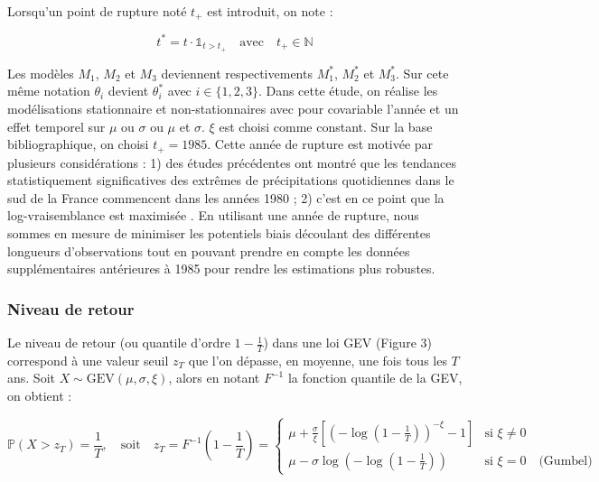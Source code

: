 \documentclass[
  article,
  nofooter,
  noheadings]{jss}
\begin{document}
Lorsqu'un point de rupture noté \(t_+\) est introduit, on note :

\[
t^\ast = t \cdot \mathbb{1}_{t > t_+} \quad \text{avec} \quad t_+ \in \mathbb{N}
\]

Les modèles \(M_1\), \(M_2\) et \(M_3\) deviennent respectivements
\(M_1^\ast\), \(M_2^\ast\) et \(M_3^\ast\). Sur cete même notation
\(\theta_i\) devient \(\theta^\ast_i\) avec \(i \in \{1, 2, 3\}\). Dans
cette étude, on réalise les modélisations stationnaire et
non-stationnaires avec pour covariable l'année et un effet temporel sur
\(\mu\) ou \(\sigma\) ou \(\mu\) et \(\sigma\). \(\xi\) est choisi comme
constant. Sur la base bibliographique, on choisi \(t_+ = 1985\). Cette
année de rupture est motivée par plusieurs considérations : 1) des
études précédentes ont montré que les tendances statistiquement
significatives des extrêmes de précipitations quotidiennes dans le sud
de la France commencent dans les années 1980 \citep{Blanchet2018} ; 2)
c'est en ce point que la log-vraisemblance est maximisée
\citep{blanchet2022instrumental}. En utilisant une année de rupture,
nous sommes en mesure de minimiser les potentiels biais découlant des
différentes longueurs d'observations tout en pouvant prendre en compte
les données supplémentaires antérieures à 1985 pour rendre les
estimations plus robustes.

\subsubsection{Niveau de retour}\label{niveau-de-retour}

Le niveau de retour (ou quantile d'ordre \(1 - \tfrac{1}{T}\)) dans une
loi GEV (Figure 3) correspond à une valeur seuil \(z_T\) que l'on
dépasse, en moyenne, une fois tous les \(T\) ans. Soit
\(X \sim \mathrm{GEV}(\mu, \sigma, \xi)\), alors en notant \(F^{-1}\) la
fonction quantile de la GEV, on obtient :

\begin{tcolorbox}[enhanced jigsaw, toprule=.15mm, bottomrule=.15mm, colback=white, breakable, left=2mm, leftrule=.75mm, colframe=quarto-callout-color-frame, arc=.35mm, rightrule=.15mm, opacityback=0]

\[
\mathbb{P}(X > z_T) = \frac{1}{T}, \quad \text{soit} \quad z_T = F^{-1}\left(1 - \frac{1}{T} \right) = 
\begin{cases}
\mu + \frac{\sigma}{\xi} \left[ \left( -\log\left(1 - \frac{1}{T}\right) \right)^{-\xi} - 1 \right] & \text{si } \xi \ne 0 \\
\mu - \sigma \log \left( -\log\left(1 - \frac{1}{T} \right) \right) & \text{si } \xi = 0 \quad \text{(Gumbel)}
\end{cases}
\]

\end{tcolorbox}
\end{document}
